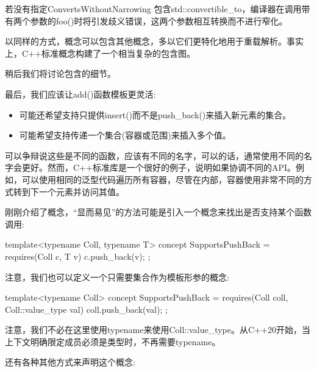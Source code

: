 若没有指定ConvertsWithoutNarrowing 包含std::convertible\_to，编译器在调用带有两个参数的foo()时将引发歧义错误，这两个参数相互转换而不进行窄化。

以同样的方式，概念可以包含其他概念，多以它们更特化地用于重载解析。事实上，C++标准概念构建了一个相当复杂的包含图。

稍后我们将讨论包含的细节。


最后，我们应该让add()函数模板更灵活:

\begin{itemize}
\item
可能还希望支持只提供insert()而不是push\_back()来插入新元素的集合。

\item
可能希望支持传递一个集合(容器或范围)来插入多个值。
\end{itemize}

可以争辩说这些是不同的函数，应该有不同的名字，可以的话，通常使用不同的名字会更好。然而，C++标准库是一个很好的例子，说明如果协调不同的API。例如，可以使用相同的泛型代码遍历所有容器，尽管在内部，容器使用非常不同的方式转到下一个元素并访问其值。


刚刚介绍了概念，“显而易见”的方法可能是引入一个概念来找出是否支持某个函数调用:

\begin{cpp}
template<typename Coll, typename T>
concept SupportsPushBack = requires(Coll c, T v) {
	c.push_back(v);
};
\end{cpp}

注意，我们也可以定义一个只需要集合作为模板形参的概念:

\begin{cpp}
template<typename Coll>
concept SupportsPushBack = requires(Coll coll, Coll::value_type val) {
	coll.push_back(val);
};
\end{cpp}

注意，我们不必在这里使用typename来使用Coll::value\_type。从C++20开始，当上下文明确限定成员必须是类型时，不再需要typename。

还有各种其他方式来声明这个概念:

